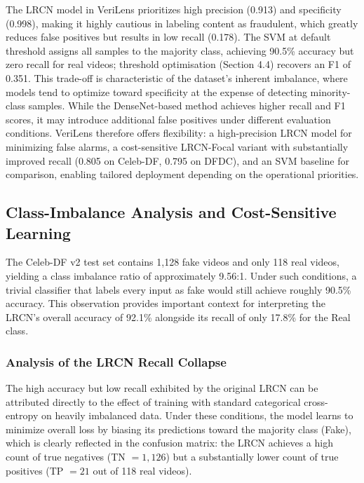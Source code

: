 The LRCN model in VeriLens prioritizes high precision (0.913) and specificity (0.998), making it highly cautious in labeling content as fraudulent, which greatly reduces false positives but results in low recall (0.178). The SVM at default threshold assigns all samples to the majority class, achieving 90.5\% accuracy but zero recall for real videos; threshold optimisation (Section 4.4) recovers an F1 of 0.351. This trade-off is characteristic of the dataset's inherent imbalance, where models tend to optimize toward specificity at the expense of detecting minority-class samples. While the DenseNet-based method achieves higher recall and F1 scores, it may introduce additional false positives under different evaluation conditions. VeriLens therefore offers flexibility: a high-precision LRCN model for minimizing false alarms, a cost-sensitive LRCN-Focal variant with substantially improved recall (0.805 on Celeb-DF, 0.795 on DFDC), and an SVM baseline for comparison, enabling tailored deployment depending on the operational priorities.



\subsection{Class-Imbalance Analysis and Cost-Sensitive Learning}
\label{sec:imbalance}

The Celeb-DF v2 test set contains 1,128 fake videos and only 118 real videos, yielding a class imbalance ratio of approximately 9.56:1. Under such conditions, a trivial classifier that labels every input as fake would still achieve roughly 90.5\% accuracy. This observation provides important context for interpreting the LRCN's overall accuracy of 92.1\% alongside its recall of only 17.8\% for the Real class.

\subsubsection*{Analysis of the LRCN Recall Collapse}

The high accuracy but low recall exhibited by the original LRCN can be attributed directly to the effect of training with standard categorical cross-entropy on heavily imbalanced data. Under these conditions, the model learns to minimize overall loss by biasing its predictions toward the majority class (Fake), which is clearly reflected in the confusion matrix: the LRCN achieves a high count of true negatives (TN $= 1{,}126$) but a substantially lower count of true positives (TP $= 21$ out of 118 real videos).

